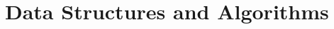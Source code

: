 \documentclass[aspectratio=1610]{beamer}
\begin{document}


    
    








\section{Data Structures and Algorithms }
\end{document}
